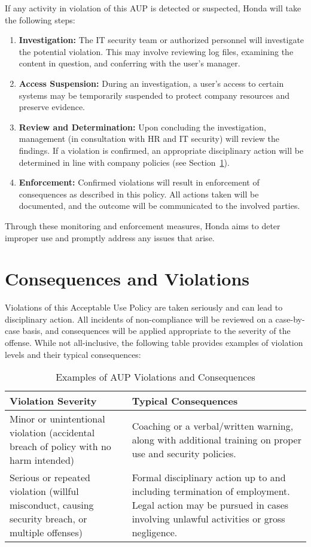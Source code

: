 If any activity in violation of this AUP is detected or suspected, Honda will take the following steps:
\begin{enumerate}
    \item \textbf{Investigation:} The IT security team or authorized personnel will investigate the potential violation. This may involve reviewing log files, examining the content in question, and conferring with the user's manager.
    \item \textbf{Access Suspension:} During an investigation, a user's access to certain systems may be temporarily suspended to protect company resources and preserve evidence.
    \item \textbf{Review and Determination:} Upon concluding the investigation, management (in consultation with HR and IT security) will review the findings. If a violation is confirmed, an appropriate disciplinary action will be determined in line with company policies (see Section~\ref{sec:consequences}).
    \item \textbf{Enforcement:} Confirmed violations will result in enforcement of consequences as described in this policy. All actions taken will be documented, and the outcome will be communicated to the involved parties.
\end{enumerate}
Through these monitoring and enforcement measures, Honda aims to deter improper use and promptly address any issues that arise.

\section{Consequences and Violations}\label{sec:consequences}
Violations of this Acceptable Use Policy are taken seriously and can lead to disciplinary action. All incidents of non-compliance will be reviewed on a case-by-case basis, and consequences will be applied appropriate to the severity of the offense. While not all-inclusive, the following table provides examples of violation levels and their typical consequences:
\begin{table}[h!]
\centering
\begin{tabular}{| p{6.5cm} | p{7.5cm} |}
\hline
\textbf{Violation Severity} & \textbf{Typical Consequences} \\
\hline
Minor or unintentional violation (accidental breach of policy with no harm intended) & Coaching or a verbal/written warning, along with additional training on proper use and security policies. \\
\hline
Serious or repeated violation (willful misconduct, causing security breach, or multiple offenses) & Formal disciplinary action up to and including termination of employment. Legal action may be pursued in cases involving unlawful activities or gross negligence. \\
\hline
\end{tabular}
\caption{Examples of AUP Violations and Consequences}\label{tab:violations}
\end{table}

